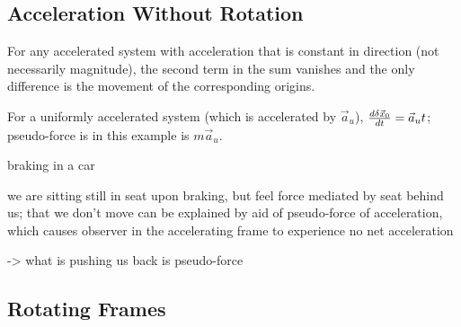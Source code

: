 \documentclass[../class_mech_main.tex]{subfiles}
\begin{document}
		\subsection{Acceleration Without Rotation}

For any accelerated system with acceleration that is constant in direction (not necessarily magnitude), the second term in the sum vanishes and the only difference is the movement of the corresponding origins.

For a uniformly accelerated system (which is accelerated by $\vec{a}_u$), $\dv{\delta \vec{x}_0}{t} = \vec{a}_u t$; pseudo-force is in this example is $m \vec{a}_u$.


\begin{ex}[Braking]
	braking in a car

	we are sitting still in seat upon braking, but feel force mediated by seat behind us; that we don't move can be explained by aid of pseudo-force of acceleration, which causes observer in the accelerating frame to experience no net acceleration

	-> what is pushing us back is pseudo-force
\end{ex}





        \subsection{Rotating Frames}
\end{document}
